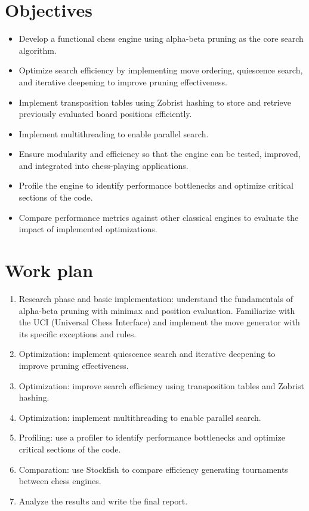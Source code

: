 \section{Objectives}

\begin{itemize}
    \item Develop a functional chess engine using alpha-beta pruning as the core search algorithm.
    \item Optimize search efficiency by implementing move ordering, quiescence search, and iterative deepening to improve pruning effectiveness.
    \item Implement transposition tables using Zobrist hashing to store and retrieve previously evaluated board positions efficiently.
    \item Implement multithreading to enable parallel search.
    \item Ensure modularity and efficiency so that the engine can be tested, improved, and integrated into chess-playing applications.
    \item Profile the engine to identify performance bottlenecks and optimize critical sections of the code.
    \item Compare performance metrics against other classical engines to evaluate the impact of implemented optimizations.
\end{itemize}

\section{Work plan}

\begin{enumerate}
    \item Research phase and basic implementation: understand the fundamentals of alpha-beta pruning with minimax and position evaluation. Familiarize with the UCI (Universal Chess Interface) and implement the move generator with its specific exceptions and rules.
    \item Optimization: implement quiescence search and iterative deepening to improve pruning effectiveness.
    \item Optimization: improve search efficiency using transposition tables and Zobrist hashing.
    \item Optimization: implement multithreading to enable parallel search.
    \item Profiling: use a profiler to identify performance bottlenecks and optimize critical sections of the code.
    \item Comparation: use Stockfish to compare efficiency generating tournaments between chess engines.
    \item Analyze the results and write the final report.
\end{enumerate}

